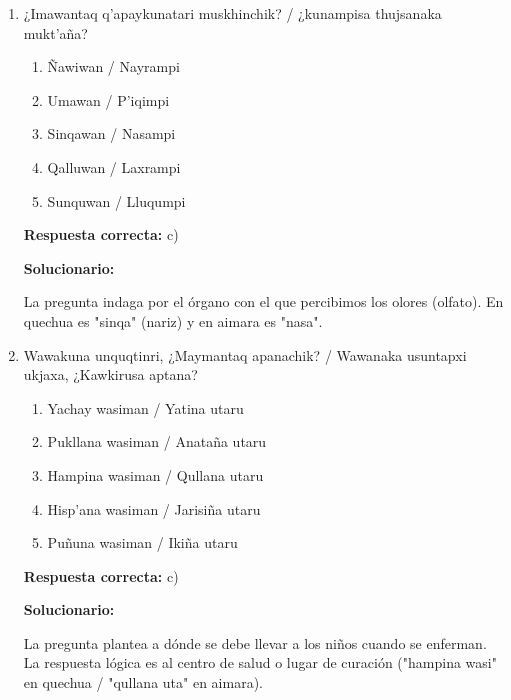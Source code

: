 \begin{enumerate}[resume]

	\item ¿Imawantaq q'apaykunatari muskhinchik? / ¿kunampisa thujsanaka mukt'aña?
	\begin{enumerate}[label=\alph*)]
		\item Ñawiwan / Nayrampi
		\item Umawan / P'iqimpi
		\item Sinqawan / Nasampi
		\item Qalluwan / Laxrampi
		\item Sunquwan / Lluqumpi
	\end{enumerate}
	\textbf{Respuesta correcta:} c)

	\vspace{2mm}
	\textbf{Solucionario:}

	La pregunta indaga por el órgano con el que percibimos los olores (olfato). En quechua es "sinqa" (nariz) y en aimara es "nasa".

	\vspace{6mm}

	\item Wawakuna unquqtinri, ¿Maymantaq apanachik? / Wawanaka usuntapxi ukjaxa, ¿Kawkirusa aptana?
	\begin{enumerate}[label=\alph*)]
		\item Yachay wasiman / Yatina utaru
		\item Pukllana wasiman / Anataña utaru
		\item Hampina wasiman / Qullana utaru
		\item Hisp'ana wasiman / Jarisiña utaru
		\item Puñuna wasiman / Ikiña utaru
	\end{enumerate}
	\textbf{Respuesta correcta:} c)

	\vspace{2mm}
	\textbf{Solucionario:}

	La pregunta plantea a dónde se debe llevar a los niños cuando se enferman. La respuesta lógica es al centro de salud o lugar de curación ("hampina wasi" en quechua / "qullana uta" en aimara).

	\vspace{6mm}

\end{enumerate}














